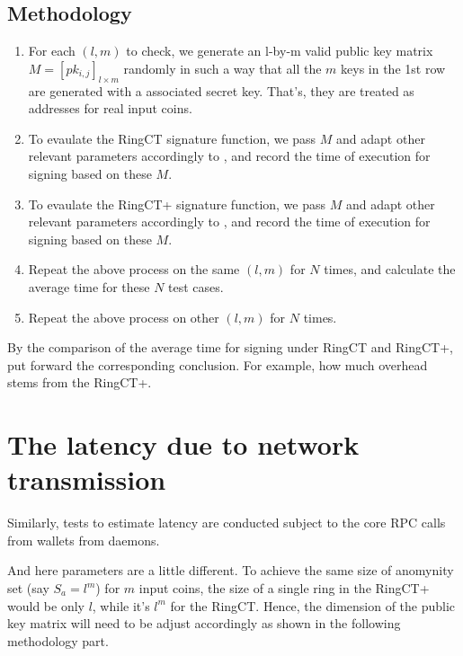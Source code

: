 \subsection{Methodology}
	\begin{enumerate}
		\item For each \( (l,m)\) to check, we generate an l-by-m valid public key matrix \(M= [pk_{i,j}]_{l\times m}\) randomly in such a way that all the \(m\) keys in the 1st row are generated with a associated secret key. That's, they are treated as addresses for real input coins.
		\item To evaulate the RingCT signature function, we pass \(M\) and adapt other relevant parameters accordingly to , and record the time of execution for signing based on these \(M\).
		\item To evaulate the RingCT+ signature function, we pass \(M\) and adapt other relevant parameters accordingly to , and record the time of execution for signing based on these \(M\).
		\item Repeat the above process on the same \( (l,m)\) for \(N\) times, and calculate the average time for these \(N\) test cases.
		\item Repeat the above process on other \( (l,m)\) for \(N\) times.
	\end{enumerate}
	By the comparison of the average time for signing under RingCT and RingCT+, put forward the corresponding conclusion. For example, how much overhead stems from the RingCT+.
\section{The latency due to network transmission}
Similarly, tests to estimate latency are conducted subject to the core RPC calls from wallets from daemons.\par
And here parameters are a little different. To achieve the same size of anomynity set (say \(S_a=l^m\)) for \(m\) input coins, the size of a single ring in the RingCT+ would be only \(l\), while it's \(l^m\) for the RingCT. Hence, the dimension of the public key matrix will need to be adjust accordingly as shown in the following methodology part.
